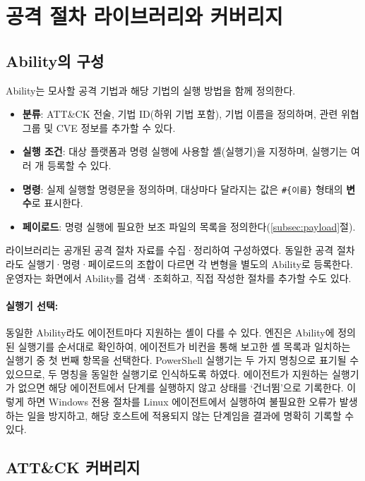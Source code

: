 \clearpage

\section{공격 절차 라이브러리와 커버리지}\label{sec:abilities}

\subsection{Ability의 구성}\label{subsec:ability}

Ability는 모사할 공격 기법과 해당 기법의 실행 방법을 함께 정의한다.

\begin{itemize}
    \item \textbf{분류}: ATT\&CK 전술, 기법 ID(하위 기법 포함), 기법 이름을 정의하며, 관련 위협 그룹 및 CVE 정보를 추가할 수 있다.
    \item \textbf{실행 조건}: 대상 플랫폼과 명령 실행에 사용할 셸(실행기)을 지정하며, 실행기는 여러 개 등록할 수 있다.
    \item \textbf{명령}: 실제 실행할 명령문을 정의하며, 대상마다 달라지는 값은 \texttt{\#\{이름\}} 형태의 \textbf{변수}로 표시한다.
    \item \textbf{페이로드}: 명령 실행에 필요한 보조 파일의 목록을 정의한다(\ref{subsec:payload}절).
\end{itemize}

라이브러리는 공개된 공격 절차 자료를 수집·정리하여 구성하였다.
동일한 공격 절차라도 실행기·명령·페이로드의 조합이 다르면 각 변형을 별도의 Ability로 등록한다.
운영자는 화면에서 Ability를 검색·조회하고, 직접 작성한 절차를 추가할 수도 있다.

\paragraph{\textbf{실행기 선택:}}
동일한 Ability라도 에이전트마다 지원하는 셸이 다를 수 있다.
엔진은 Ability에 정의된 실행기를 순서대로 확인하여, 에이전트가 비컨을 통해 보고한 셸 목록과 일치하는 실행기 중 첫 번째 항목을 선택한다.
PowerShell 실행기는 두 가지 명칭으로 표기될 수 있으므로, 두 명칭을 동일한 실행기로 인식하도록 하였다.
에이전트가 지원하는 실행기가 없으면 해당 에이전트에서 단계를 실행하지 않고 상태를 `건너뜀'으로 기록한다.
이렇게 하면 Windows 전용 절차를 Linux 에이전트에서 실행하여 불필요한 오류가 발생하는 일을 방지하고, 해당 호스트에 적용되지 않는 단계임을 결과에 명확히 기록할 수 있다.

\subsection{ATT\&CK 커버리지}\label{subsec:coverage}

